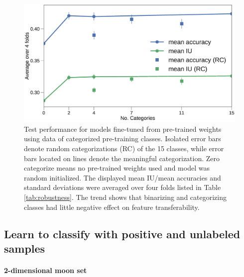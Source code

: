 \begin{figure}[t]
\centering
   \includegraphics[width=1.\linewidth]{img/num_classes.eps}
\caption{
Test performance for models fine-tuned from pre-trained weights using data of categorized pre-training classes.
Isolated error bars denote random categorizations (RC) of the 15 classes, while error bars located on lines denote the meaningful categorization.
Zero categorize means no pre-trained weights used and model was random initialized.
The displayed mean IU/mean accuracies and standard deviations were averaged over four folds listed in Table \ref{tab:robustness}.
The trend shows that binarizing and categorizing classes had little negative effect on feature transferability.
}
\label{fig:categories}
\end{figure}



\subsection{Learn to classify with positive and unlabeled samples}
\label{subsec:pulearning}



\paragraph{2-dimensional moon set}

